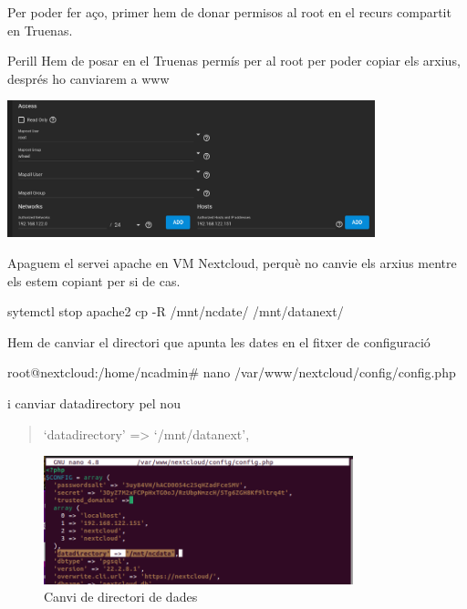 \documentclass[
  10pt,
]{krantz}
\newenvironment{Shaded}{\begin{snugshade}}{\end{snugshade}}
\newcommand{\AttributeTok}[1]{\textcolor[rgb]{0.77,0.63,0.00}{#1}}
\newcommand{\ExtensionTok}[1]{#1}
\newcommand{\FunctionTok}[1]{\textcolor[rgb]{0.00,0.00,0.00}{#1}}
\newcommand{\NormalTok}[1]{#1}
\begin{document}
Per poder fer aço, primer hem de donar permisos al root en el recurs compartit en Truenas.

\begin{rmdwarn}{Perill}
Hem de posar en el Truenas permís per al root per poder copiar els arxius, després ho canviarem a www

\includegraphics[width=0.8\textwidth,height=\textheight]{imatges/proxmox/permis_root.png}

\end{rmdwarn}

Apaguem el servei apache en VM Nextcloud, perquè no canvie els arxius mentre els estem copiant per si de cas.

\begin{Shaded}
\begin{Highlighting}[]
\ExtensionTok{sytemctl}\NormalTok{ stop apache2}
\FunctionTok{cp} \AttributeTok{{-}R}\NormalTok{ /mnt/ncdate/ /mnt/datanext/}
\end{Highlighting}
\end{Shaded}

Hem de canviar el directori que apunta les dates en el fitxer de configuració

\begin{Shaded}
\begin{Highlighting}[]
\ExtensionTok{root@nextcloud:/home/ncadmin\#}\NormalTok{ nano /var/www/nextcloud/config/config.php}
\end{Highlighting}
\end{Shaded}

i canviar datadirectory pel nou

\begin{quote}
`datadirectory' =\textgreater{} `/mnt/datanext',
\end{quote}

\begin{figure}
\centering
\includegraphics[width=0.8\textwidth,height=\textheight]{imatges/proxmox/datanext.png}
\caption{Canvi de directori de dades}
\end{figure}
\end{document}
